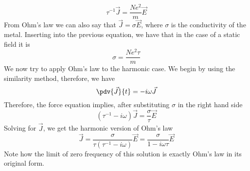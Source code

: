 \documentclass[../electromagnetism.tex]{subfiles}
\begin{document}
\begin{equation}
	\tau^{-1}\vec{J}=\frac{Ne^2}{m}\vec{E}
	\label{eq:staticsol1.csol}
\end{equation}
From Ohm's law we can also say that $\vec{J}=\sigma\vec{E}$, where $\sigma$ is the conductivity of the metal. Inserting into the previous equation, we have that in the case of a static field it is
\begin{equation}
	\sigma=\frac{Ne^2\tau}{m}
	\label{eq:condstatic.csol}
\end{equation}
We now try to apply Ohm's law to the harmonic case. We begin by using the similarity method, therefore, we have
\begin{equation*}
	\pdv{\vec{J}}{t}=-i\omega\vec{J}
\end{equation*}
Therefore, the force equation implies, after substituting $\sigma$ in the right hand side 
\begin{equation*}
	\left( \tau^{-1}-i\omega \right)\vec{J}=\frac{\sigma}{\tau}\vec{E}
\end{equation*}
Solving for $\vec{J}$, we get the harmonic version of Ohm's law
\begin{equation}
	\vec{J}=\frac{\sigma}{\tau\left( \tau^{-1}-i\omega \right)}\vec{E}=\frac{\sigma}{1-i\omega\tau}\vec{E}
	\label{eq:dynamicohm.csol}
\end{equation}
Note how the limit of zero frequency of this solution is exactly Ohm's law in its original form.\\
\end{document}
